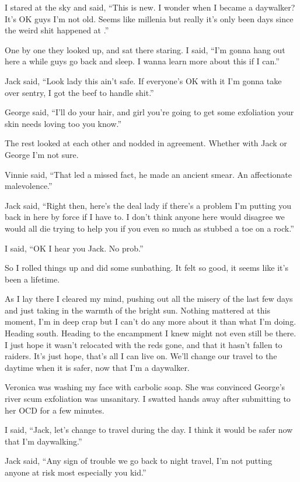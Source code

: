 I stared at the sky and said, ``This is new. I wonder when I became a daywalker? It's OK guys I'm not old. Seems like millenia but really it's only been days since the weird shit happened at \chichenitza*.''

One by one they looked up, and sat there staring. I said, ``I'm gonna hang out here a while guys go back and sleep. I wanna learn more about this if I can.''

Jack said, ``Look lady this ain't safe. If everyone's OK with it I'm gonna take over sentry, I got the beef to handle shit.''

George said, ``I'll do your hair, and girl you're going to get some exfoliation your skin needs loving too you know.''

The rest looked at each other and nodded in agreement. Whether with Jack or George I'm not sure.

Vinnie said, ``That led a missed fact, he made an ancient smear. An affectionate malevolence.''

Jack said, ``Right then, here's the deal lady if there's a problem I'm putting you back in here by force if I have to. I don't think anyone here would disagree we would all die trying to help you if you even so much as stubbed a toe on a rock.''

I said, ``OK I hear you Jack. No prob.''

So I rolled things up and did some sunbathing. It felt so good, it seems like it's been a lifetime.


As I lay there I cleared my mind, pushing out all the misery of the last few days and just taking in the warmth of the bright sun. Nothing mattered at this moment, I'm in deep crap but I can't do any more about it than what I'm doing. Heading south. Heading to the encampment I knew might not even still be there. I just hope it wasn't relocated with the reds gone, and that it hasn't fallen to raiders. It's just hope, that's all I can live on. 
We'll change our travel to the daytime when it is safer, now that I'm a daywalker. 

Veronica was washing my face with carbolic soap. She was convinced George's river scum exfoliation was unsanitary. I swatted hands away after submitting to her OCD for a few minutes.

I said, ``Jack, let's change to travel during the day. I think it would be safer now that I'm daywalking.''

Jack said, ``Any sign of trouble we go back to night travel, I'm not putting anyone at risk most especially you kid.''

